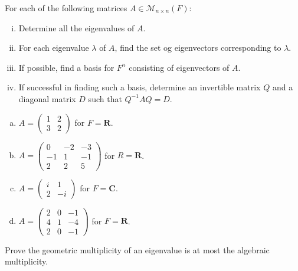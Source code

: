 \documentclass[a4paper,11pt]{article}
\newcommand{\R}{\mathbf{R}}
\newcommand{\C}{\mathbf{C}}
\newcommand{\M}{\mathcal{M}}
\begin{document}
 For each of the following matrices $A \in \M_{n
  \times n}(F)$:
\begin{enumerate}[(i)]
\item Determine all the eigenvalues of $A$.
\item For each eigenvalue $\lambda$ of $A$, find the set og eigenvectors
  corresponding to $\lambda$.
\item If possible, find a basis for $F^n$ consisting of eigenvectors of $A$.
\item If successful in finding such a basis, determine an invertible matrix $Q$
  and a diagonal matrix $D$ such that $Q^{-1}AQ=D$.
\end{enumerate}
\begin{enumerate}[(a)]
\item $A=\left( \begin{smallmatrix}1&2\\3&2\end{smallmatrix} \right)$ for $F=\R$.
\item $A=\left( \begin{smallmatrix}0&-2&-3\\-1&1&-1\\2&2&5\end{smallmatrix}
  \right)$ for $R=\R$.
\item $A=\left( \begin{smallmatrix}i&1\\2&-i\end{smallmatrix} \right)$ for $F=\C$.
\item $A=\left( \begin{smallmatrix}2&0&-1\\4&1&-4\\2&0&-1\end{smallmatrix}
  \right)$ for $F=\R$. \\
\end{enumerate}

 Prove the geometric multiplicity of an eigenvalue
is at most the algebraic multiplicity. \\
\end{document}
